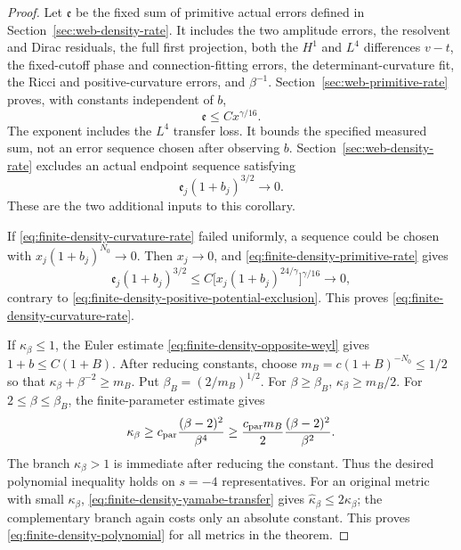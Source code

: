 \begin{proof}
Let $\mathfrak e$ be the fixed sum of primitive actual errors defined
in Section~\ref{sec:web-density-rate}.  It includes the two
amplitude errors, the resolvent and Dirac residuals, the full first
projection, both the $H^1$ and $L^4$ differences $v-t$, the fixed-cutoff
phase and connection-fitting errors, the determinant-curvature fit,
the Ricci and positive-curvature errors, and $\beta^{-1}$.
Section~\ref{sec:web-primitive-rate} proves, with constants independent
of $b$,
\begin{equation}
 \mathfrak e\le Cx^{\gamma/16}.
 \label{eq:finite-density-primitive-rate}
\end{equation}
The exponent includes the $L^4$ transfer loss.  It bounds the specified
measured sum, not an error sequence chosen after observing $b$.
Section~\ref{sec:web-density-rate} excludes an actual endpoint
sequence satisfying
\begin{equation}
 \mathfrak e_j(1+b_j)^{3/2}\longrightarrow0.
 \label{eq:finite-density-positive-potential-exclusion}
\end{equation}
These are the two additional inputs to this corollary.

If \eqref{eq:finite-density-curvature-rate} failed uniformly, a
sequence could be chosen with $x_j(1+b_j)^{N_0}\to0$.  Then
$x_j\to0$, and \eqref{eq:finite-density-primitive-rate} gives
\[
 \mathfrak e_j(1+b_j)^{3/2}
 \le C\bigl[x_j(1+b_j)^{24/\gamma}\bigr]^{\gamma/16}
       \longrightarrow0,
\]
contrary to \eqref{eq:finite-density-positive-potential-exclusion}.
This proves \eqref{eq:finite-density-curvature-rate}.

If $\kappa_\beta\le1$, the Euler estimate
\eqref{eq:finite-density-opposite-weyl} gives
$1+b\le C(1+B)$.  After reducing constants, choose
$m_B=c(1+B)^{-N_0}\le1/2$ so that
$\kappa_\beta+\beta^{-2}\ge m_B$.  Put
$\beta_B=(2/m_B)^{1/2}$.  For $\beta\ge\beta_B$,
$\kappa_\beta\ge m_B/2$.  For $2\le\beta\le\beta_B$,
the finite-parameter estimate gives
\[
 \kappa_\beta\ge c_{\rm par}\frac{(\beta-2)^2}{\beta^4}
       \ge\frac{c_{\rm par}m_B}{2}
                    \frac{(\beta-2)^2}{\beta^2}.
\]
The branch $\kappa_\beta>1$ is immediate after reducing the
constant.  Thus the desired polynomial inequality holds on
$s=-4$ representatives.  For an original metric with small
$\kappa_\beta$, \eqref{eq:finite-density-yamabe-transfer} gives
$\widehat\kappa_\beta\le2\kappa_\beta$; the complementary branch
again costs only an absolute constant.  This proves
\eqref{eq:finite-density-polynomial} for all metrics in the theorem.
\end{proof}

